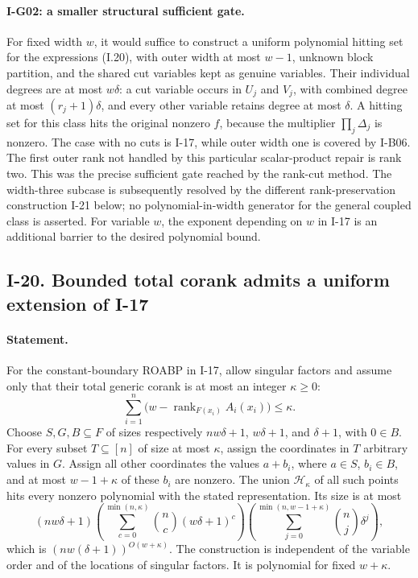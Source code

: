 \documentclass[11pt,a4paper]{article}
\theoremstyle{definition}\newtheorem{definition}{Definition}
\begin{document}
\paragraph{I-G02: a smaller structural sufficient gate.}
\label{I-G02}
For fixed width $w$, it would suffice to construct a uniform polynomial
hitting set for the expressions (I.20), with outer width at most
$w-1$, unknown block partition, and the shared cut variables kept
as genuine variables.  Their individual degrees are at most
$w\delta$: a cut variable occurs in $U_j$ and $V_j$, with combined
degree at most $(r_j+1)\delta$, and every other variable retains
degree at most $\delta$.  A hitting set for this class hits the
original nonzero $f$, because the multiplier $\prod_j\Delta_j$
is nonzero.  The case with no cuts is I-17, while outer width one
is covered by I-B06.  The first outer rank not handled by this
particular scalar-product repair is rank two.  This was the precise
sufficient gate reached by the rank-cut method.  The width-three
subcase is subsequently resolved by the different rank-preservation
construction I-21 below; no polynomial-in-width generator for
the general coupled class is asserted.  For variable
$w$, the exponent depending on $w$ in I-17 is an additional barrier
to the desired polynomial bound.

\subsection{I-20. Bounded total corank admits a uniform extension of I-17}
\label{I-20}

\paragraph{Statement.}
For the constant-boundary ROABP in I-17, allow singular factors and
assume only that their total generic corank is at most an integer
$\kappa\ge0$:
\[
 \sum_{i=1}^n\bigl(w-\operatorname{rank}_{F(x_i)}A_i(x_i)\bigr)
 \le\kappa.
\]
Choose $S,G,B\subseteq F$ of sizes respectively
$nw\delta+1$, $w\delta+1$, and $\delta+1$, with $0\in B$.
For every subset $T\subseteq[n]$ of size at most $\kappa$, assign
the coordinates in $T$ arbitrary values in $G$.  Assign all other
coordinates the values $a+b_i$, where $a\in S$, $b_i\in B$, and
at most $w-1+\kappa$ of these $b_i$ are nonzero.  The union
$\mathcal H_\kappa$ of all such points hits every nonzero polynomial
with the stated representation.  Its size is at most
\[
 (nw\delta+1)
 \left(\sum_{c=0}^{\min(n,\kappa)}\binom nc(w\delta+1)^c\right)
 \left(\sum_{j=0}^{\min(n,w-1+\kappa)}\binom nj\delta^j\right),
\tag{I.21}\label{eq:I-corank-hit}
\]
which is $(nw(\delta+1))^{O(w+\kappa)}$.
The construction is independent of the variable order and of the
locations of singular factors.  It is polynomial for fixed
$w+\kappa$.
\end{document}
